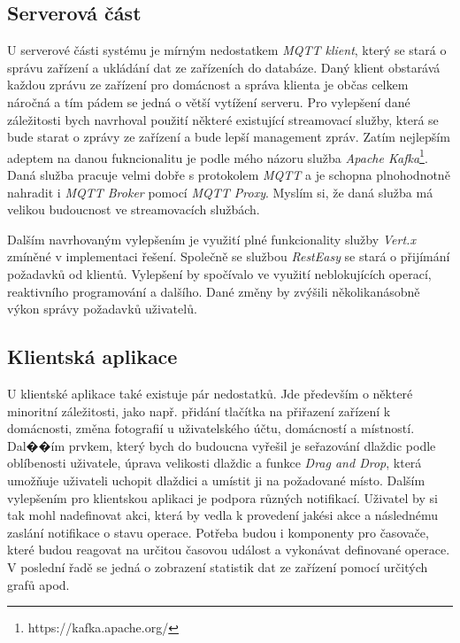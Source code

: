 \subsection*{Serverová část}
\label{testovani:navrh:server}
U serverové části systému je mírným nedostatkem \emph{MQTT klient}, který se stará o správu zařízení a ukládání dat ze zařízeních do databáze.
Daný klient obstarává každou zprávu ze zařízení pro domácnost a správa klienta je občas celkem náročná a tím pádem se jedná o větší vytížení serveru.
Pro vylepšení dané záležitosti bych navrhoval použití některé existující streamovací služby, která se bude starat o zprávy ze zařízení a bude lepší management zpráv.
Zatím nejlepším adeptem na danou fukncionalitu je podle mého názoru služba \emph{Apache Kafka}\footnote{https://kafka.apache.org/}.
Daná služba pracuje velmi dobře s protokolem \emph{MQTT} a je schopna plnohodnotně nahradit i \emph{MQTT Broker} pomocí \emph{MQTT Proxy}.
Myslím si, že daná služba má velikou budoucnost ve streamovacích službách.

Dalším navrhovaným vylepšením je využití plné funkcionality služby \emph{Vert.x} zmíněné v implementaci řešení.
Společně se službou \emph{RestEasy} se stará o přijímání požadavků od klientů.
Vylepšení by spočívalo ve využití neblokujících operací, reaktivního programování a dalšího.
Dané změny by zvýšili několikanásobně výkon správy požadavků uživatelů.

\subsection*{Klientská aplikace}
\label{testovani:navrh:frontend}
U klientské aplikace také existuje pár nedostatků.
Jde především o některé minoritní záležitosti, jako např. přidání tlačítka na přiřazení zařízení k domácnosti, změna fotografií u uživatelského účtu, domácností a místností.
Dal��ím prvkem, který bych do budoucna vyřešil je seřazování dlaždic podle oblíbenosti uživatele, úprava velikosti dlaždic a funkce \emph{Drag and Drop}, která umožňuje uživateli uchopit dlaždici a umístit ji na požadované místo.
Dalším vylepšením pro klientskou aplikaci je podpora různých notifikací.
Uživatel by si tak mohl nadefinovat akci, která by vedla k provedení jakési akce a následnému zaslání notifikace o stavu operace.
Potřeba budou i komponenty pro časovače, které budou reagovat na určitou časovou událost a vykonávat definované operace.
V poslední řadě se jedná o zobrazení statistik dat ze zařízení pomocí určitých grafů apod.

